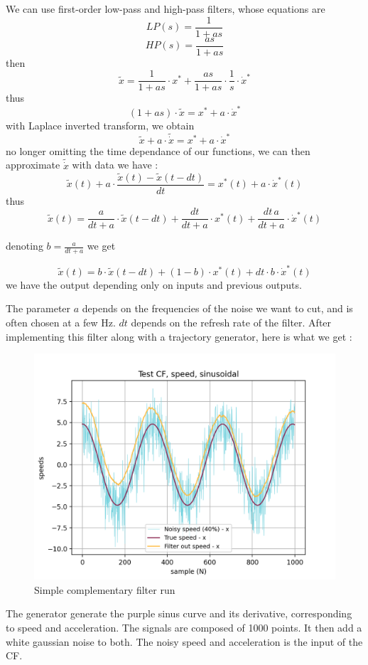 \documentclass[a4paper,10pt]{article}
\begin{document}
We can use first-order low-pass and high-pass filters, whose equations are
$$LP(s) = \frac{1}{1+as}$$
$$HP(s) = \frac{as}{1+as}$$
then
$$\widetilde{x} = \frac{1}{1+as} \cdot x^* + \frac{as}{1+as} \cdot \frac{1}{s} \cdot \dot x^* $$
thus
$$ (1+as) \cdot \tilde{x} = x^* + a\cdot \dot x^*$$
with Laplace inverted transform, we obtain
$$\widetilde{x} + a\cdot \tilde{\dot x} = x^* + a\cdot \dot x^*$$
no longer omitting the time dependance of our functions, we can then approximate $\tilde{\dot x}$ with data we have :
$$\widetilde{x}(t) + a\cdot\frac{\widetilde{x}(t) - \widetilde{x}(t-dt)}{dt} = x^*(t) + a\cdot \dot x^*(t)$$
thus
$$\widetilde{x}(t) = \frac{a}{dt+a}\cdot \widetilde{x}(t-dt) + \frac{dt}{dt+a}\cdot x^*(t) + \frac{dt\, a}{dt+a}\cdot \dot x^*(t) $$

\vspace{4mm}

\noindent denoting $b=\frac{a}{dt+a}$ we get

\vspace{2mm}


$$\widetilde{x}(t) = b\cdot \widetilde{x}(t-dt) + (1-b)\cdot x^*(t) + dt\cdot b\cdot \dot x^*(t) $$
we have the output depending only on inputs and previous outputs.

\bigskip
The parameter $a$ depends on the frequencies of the noise we want to cut, and is often chosen at a few Hz. $dt$ depends on the refresh rate of the filter.
After implementing this filter along with a trajectory generator, here is what we get :

\begin{figure}[H]
\centering
  \includegraphics[width=\linewidth, angle=0, scale=0.8]{./images/CF_withoutoffset.png}
  \caption{Simple complementary filter run}
\end{figure}
The generator generate the purple sinus curve and its derivative, corresponding to speed and acceleration. The signals are composed of 1000 points. It then add a white gaussian noise to both. The noisy speed and acceleration is the input of the CF.\\
\end{document}
